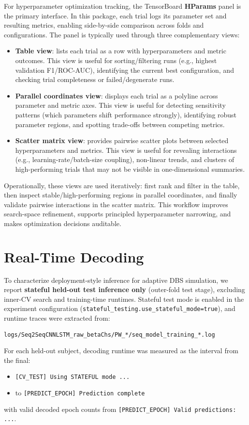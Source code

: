 For hyperparameter optimization tracking, the TensorBoard \textbf{HParams} panel is the primary interface. In this package, each trial logs its parameter set and resulting metrics, enabling side-by-side comparison across folds and configurations. The panel is typically used through three complementary views:
\begin{itemize}
\item \textbf{Table view}: lists each trial as a row with hyperparameters and metric outcomes. This view is useful for sorting/filtering runs (e.g., highest validation F1/ROC-AUC), identifying the current best configuration, and checking trial completeness or failed/degenerate runs.
\item \textbf{Parallel coordinates view}: displays each trial as a polyline across parameter and metric axes. This view is useful for detecting sensitivity patterns (which parameters shift performance strongly), identifying robust parameter regions, and spotting trade-offs between competing metrics.
\item \textbf{Scatter matrix view}: provides pairwise scatter plots between selected hyperparameters and metrics. This view is useful for revealing interactions (e.g., learning-rate/batch-size coupling), non-linear trends, and clusters of high-performing trials that may not be visible in one-dimensional summaries.
\end{itemize}
Operationally, these views are used iteratively: first rank and filter in the table, then inspect stable/high-performing regions in parallel coordinates, and finally validate pairwise interactions in the scatter matrix. This workflow improves search-space refinement, supports principled hyperparameter narrowing, and makes optimization decisions auditable.

\section{Real-Time Decoding}
\label{sec:reproducibility_real_time_decoding}
To characterize deployment-style inference for adaptive DBS simulation, we report \textbf{stateful held-out test inference only} (outer-fold test stage), excluding inner-CV search and training-time runtimes. Stateful test mode is enabled in the experiment configuration (\texttt{stateful\_testing.use\_stateful\_mode=true}), and runtime traces were extracted from:
\begin{verbatim}
logs/Seq2SeqCNNLSTM_raw_betaChs/PW_*/seq_model_training_*.log
\end{verbatim}
For each held-out subject, decoding runtime was measured as the interval from the final:
\begin{itemize}
\item \texttt{[CV\_TEST] Using STATEFUL mode ...}
\item to \texttt{[PREDICT\_EPOCH] Prediction complete}
\end{itemize}
with valid decoded epoch counts from \texttt{[PREDICT\_EPOCH] Valid predictions: ...}.

